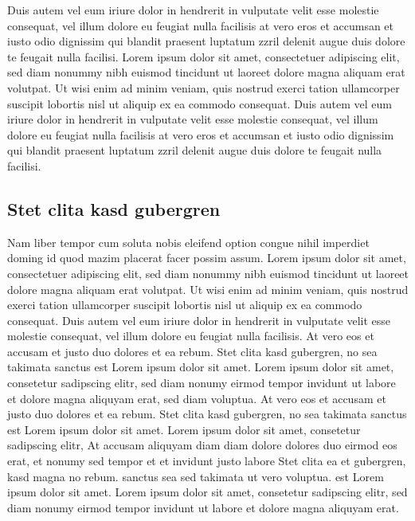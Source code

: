 Duis autem vel eum iriure dolor in hendrerit in vulputate velit esse molestie consequat, vel illum dolore eu feugiat nulla facilisis at vero eros et accumsan et iusto odio dignissim qui blandit praesent luptatum zzril delenit augue duis dolore te feugait nulla facilisi. Lorem ipsum dolor sit amet, consectetuer adipiscing elit, sed diam nonummy nibh euismod tincidunt ut laoreet dolore magna aliquam erat volutpat.
Ut wisi enim ad minim veniam, quis nostrud exerci tation ullamcorper suscipit lobortis nisl ut aliquip ex ea commodo consequat. Duis autem vel eum iriure dolor in hendrerit in vulputate velit esse molestie consequat, vel illum dolore eu feugiat nulla facilisis at vero eros et accumsan et iusto odio dignissim qui blandit praesent luptatum zzril delenit augue duis dolore te feugait nulla facilisi.

\subsection{Stet clita kasd gubergren}
Nam liber tempor cum soluta nobis eleifend option congue nihil imperdiet doming id quod mazim placerat facer possim assum. Lorem ipsum dolor sit amet, consectetuer adipiscing elit, sed diam nonummy nibh euismod tincidunt ut laoreet dolore magna aliquam erat volutpat. Ut wisi enim ad minim veniam, quis nostrud exerci tation ullamcorper suscipit lobortis nisl ut aliquip ex ea commodo consequat.
Duis autem vel eum iriure dolor in hendrerit in vulputate velit esse molestie consequat, vel illum dolore eu feugiat nulla facilisis.
At vero eos et accusam et justo duo dolores et ea rebum. Stet clita kasd gubergren, no sea takimata sanctus est Lorem ipsum dolor sit amet. Lorem ipsum dolor sit amet, consetetur sadipscing elitr, sed diam nonumy eirmod tempor invidunt ut labore et dolore magna aliquyam erat, sed diam voluptua. At vero eos et accusam et justo duo dolores et ea rebum. Stet clita kasd gubergren, no sea takimata sanctus est Lorem ipsum dolor sit amet. Lorem ipsum dolor sit amet, consetetur sadipscing elitr, At accusam aliquyam diam diam dolore dolores duo eirmod eos erat, et nonumy sed tempor et et invidunt justo labore Stet clita ea et gubergren, kasd magna no rebum. sanctus sea sed takimata ut vero voluptua. est Lorem ipsum dolor sit amet. Lorem ipsum dolor sit amet, consetetur sadipscing elitr, sed diam nonumy eirmod tempor invidunt ut labore et dolore magna aliquyam erat.

